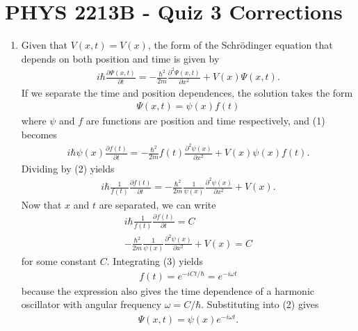 \documentclass[a4paper,12pt]{article}
\begin{document}
\section*{PHYS 2213B - Quiz 3 Corrections}

\begin{enumerate}
    \item
        Given that $V(x, t) = V(x)$, the form of the Schr\"odinger equation that depends on both position and time is given by
        \begin{align}
            i\hbar \frac{\partial \Psi(x, t)}{\partial t} = -\frac{\hbar^2}{2m} \frac{\partial^2 \Psi(x, t)}{\partial x^2} + V(x) \Psi(x, t).
        \end{align}
        If we separate the time and position dependences, the solution takes the form
        \begin{align}
            \Psi(x, t) = \psi(x) f(t)
        \end{align}
        where $\psi$ and $f$ are functions are position and time respectively, and (1) becomes
        \begin{align*}
            i \hbar \psi(x) \frac{\partial f(t)}{\partial t} = -\frac{\hbar^2}{2m} f(t) \frac{\partial^2 \psi(x)}{\partial x^2} + V(x) \psi(x) f(t).
        \end{align*}
        Dividing by (2) yields
        \begin{align*}
            i \hbar \frac{1}{f(t)} \frac{\partial f(t)}{\partial t} = -\frac{\hbar^2}{2m} \frac{1}{\psi(x)} \frac{\partial^2 \psi(x)}{\partial x^2} + V(x).
        \end{align*}
        Now that $x$ and $t$ are separated, we can write
        \begin{gather}
            i \hbar \frac{1}{f(t)} \frac{\partial f(t)}{\partial t} = C \\
            -\frac{\hbar^2}{2m} \frac{1}{\psi(x)} \frac{\partial^2 \psi(x)}{\partial x^2} + V(x) = C
        \end{gather}
        for some constant $C$. Integrating (3) yields
        \begin{align*}
            f(t) = e^{-iCt/\hbar} = e^{-i \omega t}
        \end{align*}
        because the expression also gives the time dependence of a harmonic oscillator with angular frequency $\omega = C / \hbar$. Substituting into (2) gives
        \begin{align*}
            \Psi(x, t) = \psi(x) e^{-i \omega t}.
        \end{align*}

\end{enumerate}
\end{document}
